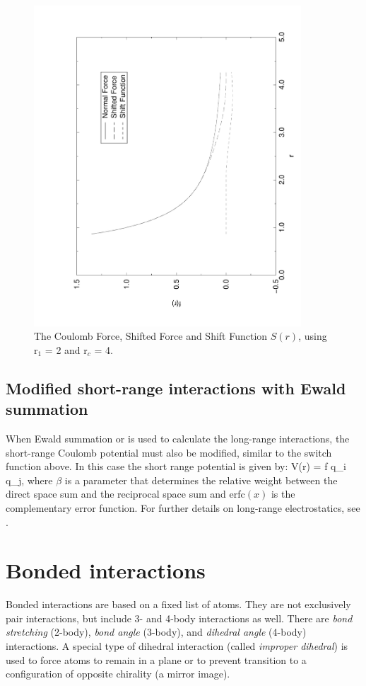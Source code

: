 \begin{figure}
\centerline{\includegraphics[angle=270,width=10cm]{plots/shiftf}}
\caption[The Coulomb Force, Shifted Force and Shift Function
$S(r)$,.]{The Coulomb Force, Shifted Force and Shift Function $S(r)$,
using r$_1$ = 2 and r$_c$ = 4.} 
\label{fig:shift}
\end{figure}

\subsection{Modified short-range interactions with Ewald summation}
When Ewald summation or  is used to calculate the
long-range interactions, the 
short-range Coulomb potential must also be modified, similar to the
switch function above. In this case the short range potential is given
by:
\beq
V(r) = f  q_i q_j,
\eeq
where $\beta$ is a parameter that determines the relative weight 
between the direct space sum and the reciprocal space sum and erfc$(x)$ is
the complementary error function. For further 
details on long-range electrostatics, see .


\section{Bonded interactions}
Bonded interactions are based on a fixed list of atoms. They are not
exclusively pair interactions, but include 3- and 4-body interactions
as well. There are {\em bond stretching} (2-body), {\em bond angle}
(3-body), and {\em dihedral angle} (4-body) interactions. A special
type of dihedral interaction (called {\em improper dihedral}) is used
to force atoms to remain in a plane or to prevent transition to a
configuration of opposite chirality (a mirror image).

